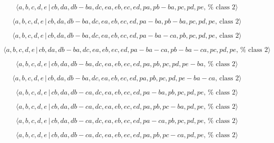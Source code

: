 \documentclass[10pt]{article}
\begin{document}
\begin{equation}
\langle a,b,c,d,e\,|\,cb,da,db-ba,dc,ea,eb,ec,ed,pa,pb-ba,pc,pd,pe,\,\text{%
class }2\rangle  \tag{7.4601}
\end{equation}

\begin{equation}
\langle a,b,c,d,e\,|\,cb,da,db-ba,dc,ea,eb,ec,ed,pa-ba,pb-ba,pc,pd,pe,\,%
\text{class }2\rangle  \tag{7.4602}
\end{equation}

\begin{equation}
\langle a,b,c,d,e\,|\,cb,da,db-ba,dc,ea,eb,ec,ed,pa-ba-ca,pb,pc,pd,pe,\,%
\text{class }2\rangle  \tag{7.4603}
\end{equation}

\begin{equation}
\langle
a,b,c,d,e\,|\,cb,da,db-ba,dc,ea,eb,ec,ed,pa-ba-ca,pb-ba-ca,pc,pd,pe,\,\text{%
class }2\rangle  \tag{7.4604}
\end{equation}

\begin{equation}
\langle a,b,c,d,e\,|\,cb,da,db-ba,dc,ea,eb,ec,ed,pa,pb,pc,pd,pe-ba,\,\text{%
class }2\rangle  \tag{7.4605}
\end{equation}

\begin{equation}
\langle a,b,c,d,e\,|\,cb,da,db-ba,dc,ea,eb,ec,ed,pa,pb,pc,pd,pe-ba-ca,\,%
\text{class }2\rangle  \tag{7.4606}
\end{equation}

\begin{equation}
\langle a,b,c,d,e\,|\,cb,da,db-ca,dc,ea,eb,ec,ed,pa-ba,pb,pc,pd,pe,\,\text{%
class }2\rangle  \tag{7.4607}
\end{equation}

\begin{equation}
\langle a,b,c,d,e\,|\,cb,da,db-ca,dc,ea,eb,ec,ed,pa,pb,pc-ba,pd,pe,\,\text{%
class }2\rangle  \tag{7.4608}
\end{equation}

\begin{equation}
\langle a,b,c,d,e\,|\,cb,da,db-ca,dc,ea,eb,ec,ed,pa-ca,pb,pc,pd,pe,\,\text{%
class }2\rangle  \tag{7.4609}
\end{equation}

\begin{equation}
\langle a,b,c,d,e\,|\,cb,da,db-ca,dc,ea,eb,ec,ed,pa,pb,pc-ca,pd,pe,\,\text{%
class }2\rangle  \tag{7.4610}
\end{equation}
\end{document}
